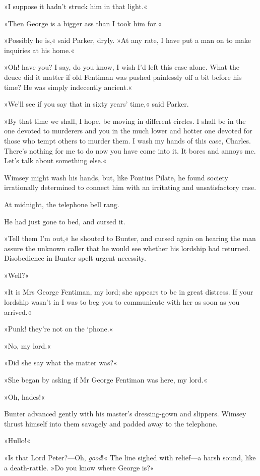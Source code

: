 »I suppose it hadn't struck him in that light.«

»Then George is a bigger ass than I took him for.«

»Possibly he is,« said Parker, dryly. »At any rate, I have put a man on to make inquiries at his home.«

»Oh! have you? I say, do you know, I wish I'd left this case alone. What the deuce did it matter if old Fentiman was pushed painlessly off a bit before his time? He was simply indecently ancient.«

»We'll see if you say that in sixty years' time,« said Parker.

»By that time we shall, I hope, be moving in different circles. I shall be in the one devoted to murderers and you in the much lower and hotter one devoted for those who tempt others to murder them. I wash my hands of this case, Charles. There's nothing for me to do now you have come into it. It bores and annoys me. Let's talk about something else.«

Wimsey might wash his hands, but, like Pontius Pilate, he found society irrationally determined to connect him with an irritating and unsatisfactory case.

At midnight, the telephone bell rang.

He had just gone to bed, and cursed it.

»Tell them I'm out,« he shouted to Bunter, and cursed again on hearing the man assure the unknown caller that he would see whether his lordship had returned. Disobedience in Bunter spelt urgent necessity.

»Well?«

»It is Mrs George Fentiman, my lord; she appears to be in great distress. If your lordship wasn't in I was to beg you to communicate with her as soon as you arrived.«

»Punk! they're not on the `phone.«

»No, my lord.«

»Did she say what the matter was?«

»She began by asking if Mr George Fentiman was here, my lord.«

»Oh, hades!«

Bunter advanced gently with his master's dressing-gown and slippers. Wimsey thrust himself into them savagely and padded away to the telephone.

»Hullo!«

»Is that Lord Peter?—Oh, \textit{good}!« The line sighed with relief—a harsh sound, like a death-rattle. »Do you know where George is?«

